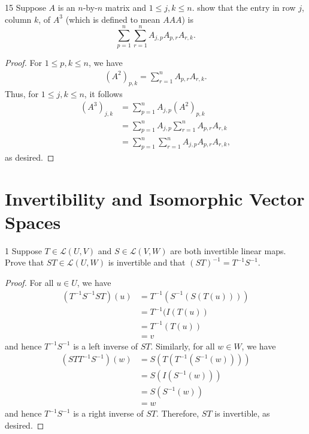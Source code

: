 \documentclass{extarticle}
\newenvironment{problem}[1]{\begin{prob*}{#1}{}}{\end{prob*}}
\newcommand{\Hom}{\mathcal{L}}
\begin{document}
\begin{problem}{15}
Suppose $A$ is an $n$-by-$n$ matrix and $1\leq j,k\leq n$.  show that the entry in row $j$, column $k$, of $A^3$ (which is defined to mean $AAA$) is
\begin{equation*}
\sum_{p=1}^n\sum_{r = 1}^nA_{j,p}A_{p,r}A_{r,k}.
\end{equation*}
\end{problem}
\begin{proof}
For $1\leq p,k\leq n$, we have
\begin{align*}
(A^2)_{p,k} = \sum_{r=1}^nA_{p,r}A_{r,k}.
\end{align*}
Thus, for $1\leq j,k\leq n$, it follows
\begin{align*}
(A^3)_{j,k} &= \sum_{p = 1}^n A_{j,p}(A^2)_{p,k}\\
&= \sum_{p = 1}^nA_{j,p}\sum_{r = 1}^n A_{p, r}A_{r, k}\\
&= \sum_{p = 1}^n\sum_{r = 1}^nA_{j,p}A_{p,r}A_{r, k},
\end{align*}
as desired.
\end{proof}


\section{Invertibility and Isomorphic Vector Spaces}

\begin{problem}{1}
Suppose $T\in\Hom(U,V)$ and $S\in\Hom(V,W)$ are both invertible linear maps.  Prove that $ST\in\Hom(U,W)$ is invertible and that $(ST)^{-1}=T^{-1}S^{-1}$.  
\end{problem}
\begin{proof}
For all $u \in U$, we have
\begin{align*}
(T^{-1}S^{-1}ST)(u) &= T^{-1}(S^{-1}(S(T(u))))\\
&= T^{-1}(I(T(u))\\
&= T^{-1}(T(u))\\
&= v
\end{align*}
and hence $T^{-1}S^{-1}$ is a left inverse of $ST$.  Similarly, for all $w \in W$, we have
\begin{align*}
(STT^{-1}S^{-1})(w) &= S(T(T^{-1}(S^{-1}(w))))\\
&= S(I(S^{-1}(w)))\\
&= S(S^{-1}(w))\\
&= w
\end{align*}
and hence $T^{-1}S^{-1}$ is a right inverse of $ST$.  Therefore, $ST$ is invertible, as desired.
\end{proof}
\end{document}
